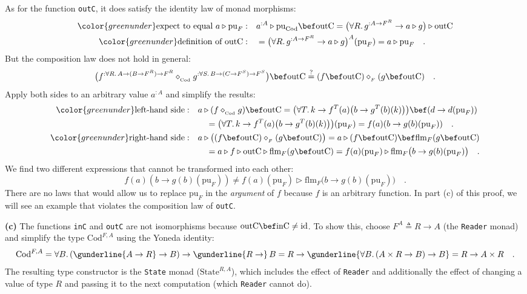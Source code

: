 As for the function \lstinline!outC!, it does satisfy the identity
law of monad morphisms:
\begin{align*}
{\color{greenunder}\text{expect to equal }a\triangleright\text{pu}_{F}:}\quad & a^{:A}\triangleright\text{pu}_{\text{Cod}}\bef\text{outC}=\big(\forall R.\,g^{:A\rightarrow F^{R}}\rightarrow a\triangleright g\big)\triangleright\text{outC}\\
{\color{greenunder}\text{definition of }\text{outC}:}\quad & =\big(\forall R.\,g^{:A\rightarrow F^{R}}\rightarrow a\triangleright g\big)^{A}(\text{pu}_{F})=a\triangleright\text{pu}_{F}\quad.
\end{align*}
But the composition law does not hold in general:
\[
\big(f^{:\forall R.\,A\rightarrow(B\rightarrow F^{R})\rightarrow F^{R}}\diamond_{_{\text{Cod}}}g^{:\forall S.\,B\rightarrow(C\rightarrow F^{S})\rightarrow F^{S}}\big)\bef\text{outC}\overset{?}{=}(f\bef\text{outC})\diamond_{_{F}}(g\bef\text{outC})\quad.
\]
Apply both sides to an arbitrary value $a^{:A}$ and simplify the
results:
\begin{align*}
{\color{greenunder}\text{left-hand side}:}\quad & a\triangleright(f\diamond_{_{\text{Cod}}}g)\bef\text{outC}=\big(\forall T.\,k\rightarrow f^{T}(a)\big(b\rightarrow g^{T}(b)(k)\big)\big)\bef(d\rightarrow d(\text{pu}_{F}))\\
 & \quad=\big(\forall T.\,k\rightarrow f^{T}(a)\big(b\rightarrow g^{T}(b)(k)\big)\big)(\text{pu}_{F})=f(a)(b\rightarrow g(b)(\text{pu}_{F}))\quad.\\
{\color{greenunder}\text{right-hand side}:}\quad & a\triangleright\big((f\bef\text{outC})\diamond_{_{F}}(g\bef\text{outC})\big)=a\triangleright(f\bef\text{outC})\bef\text{flm}_{F}(g\bef\text{outC})\\
 & \quad=a\triangleright f\triangleright\text{outC}\triangleright\text{flm}_{F}(g\bef\text{outC})=f(a)(\text{pu}_{F})\triangleright\text{flm}_{F}\big(b\rightarrow g(b)(\text{pu}_{F})\big)\quad.
\end{align*}
We find two different expressions that cannot be transformed into
each other:
\[
f(a)(b\rightarrow g(b)(\text{pu}_{F}))\neq f(a)(\text{pu}_{F})\triangleright\text{flm}_{F}\big(b\rightarrow g(b)(\text{pu}_{F})\big)\quad.
\]
There are no laws that would allow us to replace $\text{pu}_{F}$
in the \emph{argument} of $f$ because $f$ is an arbitrary function.
In part (c) of this proof, we will see an example that violates the
composition law of \lstinline!outC!.

\textbf{(c)} The functions \lstinline!inC! and \lstinline!outC!
are not isomorphisms because $\text{outC}\bef\text{inC}\not=\text{id}$.
To show this, choose $F^{A}\triangleq R\rightarrow A$ (the \lstinline!Reader!
monad) and simplify the type $\text{Cod}^{F,A}$ using the Yoneda
identity:
\[
\text{Cod}^{F,A}=\forall B.\,(\gunderline{A\rightarrow R}\rightarrow B)\rightarrow\gunderline{R\rightarrow}\,B=R\rightarrow\gunderline{\forall B.\,(A\times R\rightarrow B)\rightarrow B}=R\rightarrow A\times R\quad.
\]
The resulting type constructor is the \lstinline!State! monad ($\text{State}^{R,A}$),
which includes the effect of \lstinline!Reader! and additionally
the effect of changing a value of type $R$ and passing it to the
next computation (which \lstinline!Reader! cannot do). 

